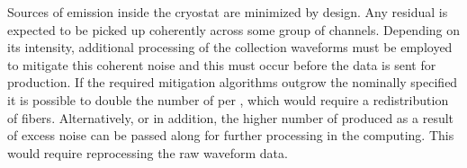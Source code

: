 Sources of  emission inside the cryostat are minimized by
design. 
Any residual  is expected to be picked up coherently across
some group of channels. 
Depending on its intensity, additional processing of the collection
waveforms must be employed to mitigate this coherent noise and this
must occur before the data is sent for 
production. 
If the required mitigation algorithms outgrow the nominally specified
  it is possible to double the number of
 per , which would require a redistribution of fibers. 
Alternatively, or in addition, the higher number of
 produced as a result of excess noise can be
passed along for further processing in the  computing. 
This would require reprocessing the raw waveform data.

